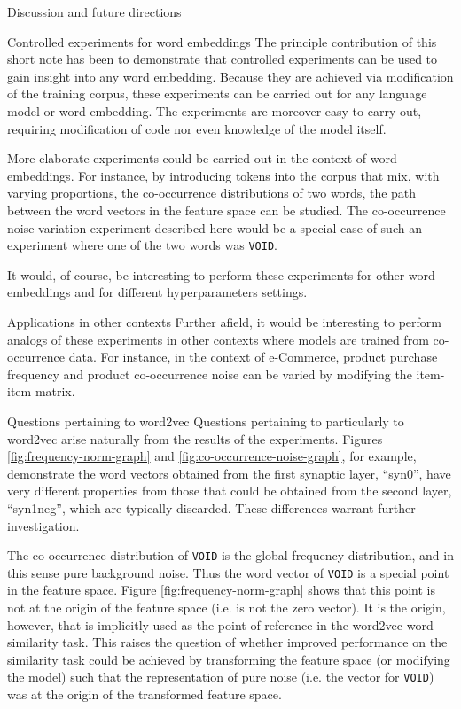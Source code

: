 \documentclass{article} %
\newcommand{\word}[1]{\texttt{#1}}
\begin{document}
\begin{section}{Discussion and future directions}\label{future-directions}

\begin{subsection}{Controlled experiments for word embeddings}
The principle contribution of this short note has been to demonstrate that controlled experiments can be used to gain insight into any word embedding.
Because they are achieved via modification of the training corpus, these experiments can be carried out for any language model or word embedding.
The experiments are moreover easy to carry out, requiring modification of code nor even knowledge of the model itself.

More elaborate experiments could be carried out in the context of word embeddings.
For instance, by introducing tokens into the corpus that mix, with varying proportions, the co-occurrence distributions of two words, the path between the word vectors in the feature space can be studied.
The co-occurrence noise variation experiment described here would be a special case of such an experiment where one of the two words was \word{VOID}.

It would, of course, be interesting to perform these experiments for other word embeddings and for different hyperparameters settings.
\end{subsection}

\begin{subsection}{Applications in other contexts}
Further afield, it would be interesting to perform analogs of these experiments in other contexts where models are trained from co-occurrence data.
For instance, in the context of e-Commerce, product purchase frequency and product co-occurrence noise can be varied by modifying the item-item matrix.
\end{subsection}

\begin{subsection}{Questions pertaining to word2vec}
Questions pertaining to particularly to word2vec arise naturally from the results of the experiments.
Figures \ref{fig:frequency-norm-graph} and \ref{fig:co-occurrence-noise-graph}, for example, demonstrate the word vectors obtained from the first synaptic layer, ``syn0'', have very different properties from those that could be obtained from the second layer, ``syn1neg'', which are typically discarded.
These differences warrant further investigation.

The co-occurrence distribution of \word{VOID} is the global frequency distribution, and in this sense pure background noise.
Thus the word vector of \word{VOID} is a special point in the feature space.
Figure \ref{fig:frequency-norm-graph} shows that this point is not at the origin of the feature space (i.e. is not the zero vector).
It is the origin, however, that is implicitly used as the point of reference in the word2vec word similarity task.
This raises the question of whether improved performance on the similarity task could be achieved by transforming the feature space (or modifying the model) such that the representation of pure noise (i.e. the vector for \word{VOID}) was at the origin of the transformed feature space. 
\end{subsection}

\end{section}

\clearpage
\footnotesize


\end{document}
